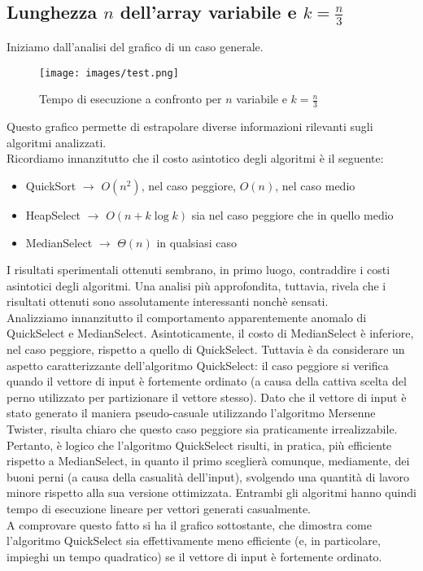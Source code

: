 \documentclass{article}
\begin{document}
	\subsection{Lunghezza $n$ dell'array variabile e $k=\frac{n}{3}$}
	Iniziamo dall'analisi del grafico di un caso generale.
	\begin{figure}[h!]
  		\texttt{[image: images/test.png]}
  		\caption{Tempo di esecuzione a confronto per $n$ variabile e $k=\frac{n}{3}$}
  		\label{fig:graph1}
	\end{figure}	
	
	Questo grafico permette di estrapolare diverse informazioni rilevanti sugli algoritmi analizzati.\\
	Ricordiamo innanzitutto che il costo asintotico degli algoritmi è il seguente:
	
	\begin{itemize}
		\item QuickSort $\rightarrow$ $O\left(n^{2}\right)$, nel caso peggiore, $O\left(n\right)$, nel caso medio
		\item HeapSelect $\rightarrow$ $O(n + k\log{k})$ sia nel caso peggiore che in quello medio
		\item MedianSelect $\rightarrow$ $\Theta(n)$ in qualsiasi caso
	\end{itemize}
	
	I risultati sperimentali ottenuti sembrano, in primo luogo, contraddire i costi asintotici degli algoritmi. Una analisi più approfondita, tuttavia, rivela che i risultati ottenuti sono assolutamente interessanti nonchè sensati. \\ Analizziamo innanzitutto il comportamento apparentemente anomalo di QuickSelect e MedianSelect. Asintoticamente, il costo di MedianSelect è inferiore, nel caso peggiore, rispetto a quello di QuickSelect. Tuttavia è da considerare un aspetto caratterizzante dell'algoritmo QuickSelect: il caso peggiore si verifica quando il vettore di input è fortemente ordinato (a causa della cattiva scelta del perno utilizzato per partizionare il vettore stesso). Dato che il vettore di input è stato generato il maniera pseudo-casuale utilizzando l'algoritmo Mersenne Twister, risulta chiaro che questo caso peggiore sia praticamente irrealizzabile. Pertanto, è logico che l'algoritmo QuickSelect risulti, in pratica, più efficiente rispetto a MedianSelect, in quanto il primo sceglierà comunque, mediamente, dei buoni perni (a causa della casualità dell'input), svolgendo una quantità di lavoro minore rispetto alla sua versione ottimizzata. Entrambi gli algoritmi hanno quindi tempo di esecuzione lineare per vettori generati casualmente. \\ A comprovare questo fatto si ha il grafico sottostante, che dimostra come l'algoritmo QuickSelect sia effettivamente meno efficiente (e, in particolare, impieghi un tempo quadratico) se il vettore di input è fortemente ordinato.
	
\end{document}
